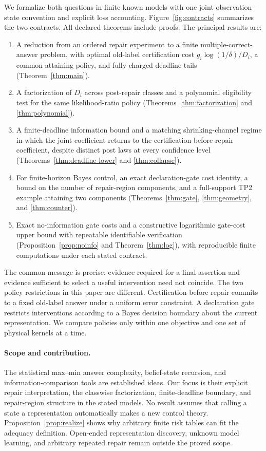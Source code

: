 We formalize both questions in finite known models with one joint
observation--state convention and explicit loss accounting.
Figure~\ref{fig:contracts} summarizes the two contracts. All declared
theorems include proofs. The principal results are:
\begin{enumerate}
\item A reduction from an ordered repair experiment to a finite
multiple-correct-answer problem, with optimal old-label certification cost
$g_i\log(1/\delta)/D_i$, a common attaining policy, and fully charged deadline
tails (Theorem~\ref{thm:main}).
\item A factorization of $D_i$ across post-repair classes and a polynomial
eligibility test for the same likelihood-ratio policy
(Theorems~\ref{thm:factorization} and \ref{thm:polynomial}).
\item A finite-deadline information bound and a matching shrinking-channel
regime in which the joint coefficient returns to the certification-before-repair
coefficient, despite distinct post laws at every confidence level
(Theorems~\ref{thm:deadline-lower} and \ref{thm:collapse}).
\item For finite-horizon Bayes control, an exact declaration-gate cost identity,
a bound on the number of repair-region components, and a full-support TP2
example attaining two components (Theorems~\ref{thm:gate},
\ref{thm:geometry}, and \ref{thm:counter}).
\item Exact no-information gate costs and a constructive logarithmic gate-cost
upper bound with repeatable identifiable verification
(Proposition~\ref{prop:noinfo} and Theorem~\ref{thm:log}), with reproducible
finite computations under each stated contract.
\end{enumerate}

The common message is precise: evidence required for a final assertion and
evidence sufficient to select a useful intervention need not coincide.
The two policy restrictions in this paper are different. Certification before
repair commits to a fixed old-label answer under a uniform error constraint.
A declaration gate restricts interventions according to a Bayes decision
boundary about the current representation. We compare policies only within
one objective and one set of physical kernels at a time.

\paragraph{Scope and contribution.}
The statistical max--min answer complexity, belief-state recursion, and
information-comparison tools are established ideas. Our focus is their explicit
repair interpretation, the classwise factorization, finite-deadline boundary,
and repair-region structure in the stated models. No result assumes that
calling a state a representation automatically makes a new control theory.
Proposition~\ref{prop:realize} shows why arbitrary finite risk tables can fit
the adequacy definition. Open-ended representation discovery, unknown model
learning, and arbitrary repeated repair remain outside the proved scope.

